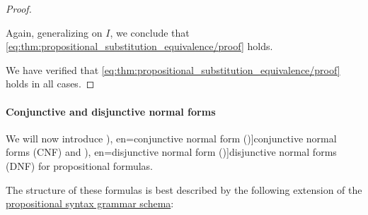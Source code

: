 \begin{proof}
\begin{itemize}
    Again, generalizing on \( I \), we conclude that \eqref{eq:thm:propositional_substitution_equivalence/proof} holds.
  \end{itemize}

  We have verified that \eqref{eq:thm:propositional_substitution_equivalence/proof} holds in all cases.
\end{proof}

\paragraph{Conjunctive and disjunctive normal forms}

\begin{definition}\label{def:cnf_and_dnf}\mimprovised
  We will now introduce \term[ru=конъюнктивная нормальная форма (\cite[def. 6.2]{Эдельман1975}), en=conjunctive normal form (\cite[def. 1.3.10]{Hinman2005})]{conjunctive normal forms} (CNF) and \term[ru=дизъюнктивная нормальная форма (\cite[def. 6.2]{Эдельман1975}), en=disjunctive normal form (\cite[def. 1.3.10]{Hinman2005})]{disjunctive normal forms} (DNF) for propositional formulas.

  The structure of these formulas is best described by the following extension of the \hyperref[def:propositional_syntax]{propositional syntax grammar schema}:
  \begin{bnf*}
           {} \\
           {\synneg {}} \\
                    {       \bnfor {}} \\
     { \bnfor} \\
     \\
                        { \bnfor \bnftsq{(} \bnfsp {}              \bnfsp \bnftsq{\( \synwedge \)} \bnfsp {}             \bnfsp \bnftsq{)}} \\
     { \bnfor} \\
     \\
                        { \bnfor \bnftsq{(} \bnfsp {}              \bnfsp \bnftsq{\( \synvee \)}   \bnfsp {}             \bnfsp \bnftsq{)}}
  \end{bnf*}
\end{definition}

